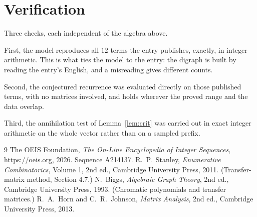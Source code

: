 \documentclass[11pt,a4paper]{article}
\theoremstyle{plain}
\theoremstyle{definition}
\begin{document}
\section{Verification}

Three checks, each independent of the algebra above.

First, the model reproduces all $12$ terms the entry publishes, exactly, in integer
arithmetic. This is what ties the model to the entry: the digraph is built by reading the
entry's English, and a misreading gives different counts.

Second, the conjectured recurrence was evaluated directly on those published terms, with no
matrices involved, and holds wherever the proved range and the data overlap.

Third, the annihilation test of Lemma~\ref{lem:crit} was carried out in exact integer
arithmetic on the whole vector rather than on a sampled prefix.

\begin{thebibliography}{9}
 The OEIS Foundation, \emph{The On-Line Encyclopedia of Integer
Sequences}, \url{https://oeis.org}, 2026. Sequence A214137.
 R.~P.~Stanley, \emph{Enumerative Combinatorics}, Volume 1, 2nd ed.,
Cambridge University Press, 2011. (Transfer-matrix method, Section 4.7.)
 N.~Biggs, \emph{Algebraic Graph Theory}, 2nd ed., Cambridge University
Press, 1993. (Chromatic polynomials and transfer matrices.)
 R.~A.~Horn and C.~R.~Johnson, \emph{Matrix Analysis}, 2nd ed., Cambridge
University Press, 2013.
\end{thebibliography}
\end{document}

